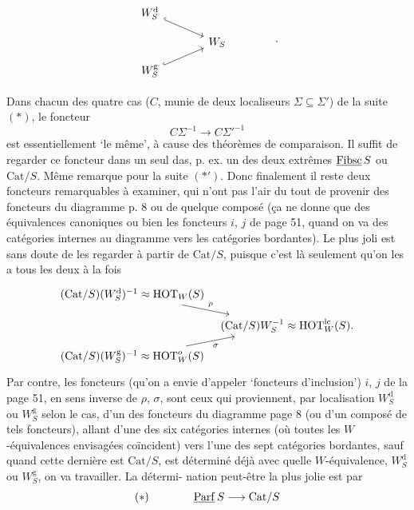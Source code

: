 \[
\begin{tikzcd}[row sep=small, column sep=large]
W_S^{\mathrm{d}} \arrow[dr, hook] & \\
& W_S \\
W_S^{\mathrm{g}} \arrow[ur, hook] &
\end{tikzcd}
\qquad\qquad .
\]


Dans chacun des quatre cas ($C$, munie de deux localiseurs $\Sigma \subseteq \Sigma'$) de la suite $(*)$, le foncteur
\[C\Sigma^{-1} \longrightarrow C\Sigma'^{-1}\]
est essentiellement ‘le même’, à cause des théorèmes de comparaison. Il suffit de regarder ce foncteur dans un seul das, p. ex. un des deux extrêmes $\underline{\mathrm{Fibsc}}\,S$ ou $\mathrm{Cat}/S$. Même remarque pour la suite $(*')$. Donc finalement il reste deux foncteurs remarquables %
à examiner, qui n'ont pas l'air du tout de provenir des foncteurs du diagramme p. 8 ou de quelque composé (ça ne donne que des équivalences canoniques ou bien les foncteurs $i$, $j$ de page 51, quand on va des catégories internes au diagramme vers les catégories bordantes). Le plus joli est sans doute de les regarder à partir de $\mathrm{Cat}/S$, puisque c'est là seulement qu'on les a tous les deux à la fois
\[
\begin{tikzcd}[row sep=small, column sep=tiny]
(\mathrm{Cat}/S)(W_S^{\mathrm{d}})^{-1} \approx \mathrm{HOT}_W(S) \arrow[dr, "\rho"] & \\
& (\mathrm{Cat}/S)W_S^{-1} \approx \mathrm{HOT}_W^{\mathrm{lc}}(S). \\
(\mathrm{Cat}/S)(W_S^{\mathrm{g}})^{-1} \approx \mathrm{HOT}_W^{o}(S) \arrow[ur, "\sigma"'] &
\end{tikzcd}
\]
Par contre, les foncteurs (qu'on a envie d'appeler ‘foncteurs d'inclusion’) $i$, $j$ de la page 51, en sens inverse de $\rho$, $\sigma$, sont ceux qui proviennent, par localisation $W_S^{\mathrm{d}}$ ou $W_S^{\mathrm{g}}$ selon le cas, d'un des foncteurs du diagramme page 8 (ou d'un composé de tels foncteurs), allant d'une des six catégories internes (où toutes les $W$-équivalences envisagées coïncident) vers l'une des sept catégories bordantes, sauf quand cette dernière est $\mathrm{Cat}/S$, est déterminé déjà avec quelle $W$-équivalence, $W_S^{\mathrm{d}}$ ou $W_S^{\mathrm{g}}$, on va travailler. La détermi-%
nation peut-être la plus jolie est par
\[(*) \qquad\qquad \underline{\mathrm{Parf}}\,S \longrightarrow \mathrm{Cat}/S\]
